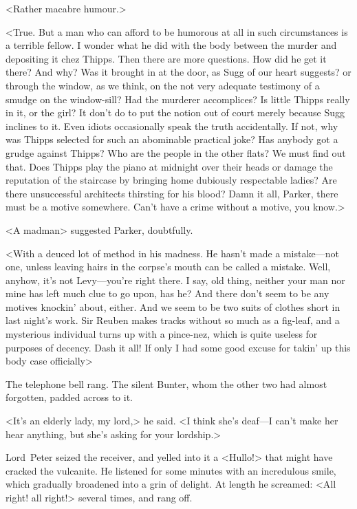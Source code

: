 <Rather macabre humour.>

<True. But a man who can afford to be humorous at all in such circumstances is a terrible fellow. I wonder what he did with the body between the murder and depositing it chez Thipps. Then there are more questions. How did he get it there? And why? Was it brought in at the door, as Sugg of our heart suggests? or through the window, as we think, on the not very adequate testimony of a smudge on the window-sill? Had the murderer accomplices? Is little Thipps really in it, or the girl? It don't do to put the notion out of court merely because Sugg inclines to it. Even idiots occasionally speak the truth accidentally. If not, why was Thipps selected for such an abominable practical joke? Has anybody got a grudge against Thipps? Who are the people in the other flats? We must find out that. Does Thipps play the piano at midnight over their heads or damage the reputation of the staircase by bringing home dubiously respectable ladies? Are there unsuccessful architects thirsting for his blood? Damn it all, Parker, there must be a motive somewhere. Can't have a crime without a motive, you know.>

<A madman\longdash> suggested Parker, doubtfully.

<With a deuced lot of method in his madness. He hasn't made a mistake—not one, unless leaving hairs in the corpse's mouth can be called a mistake. Well, anyhow, it's not Levy—you're right there. I say, old thing, neither your man nor mine has left much clue to go upon, has he? And there don't seem to be any motives knockin' about, either. And we seem to be two suits of clothes short in last night's work. Sir Reuben makes tracks without so much as a fig-leaf, and a mysterious individual turns up with a pince-nez, which is quite useless for purposes of decency. Dash it all! If only I had some good excuse for takin' up this body case officially\longdash>

The telephone bell rang. The silent Bunter, whom the other two had almost forgotten, padded across to it.

<It's an elderly lady, my lord,> he said. <I think she's deaf—I can't make her hear anything, but she's asking for your lordship.>

Lord~Peter seized the receiver, and yelled into it a <Hullo!> that might have cracked the vulcanite. He listened for some minutes with an incredulous smile, which gradually broadened into a grin of delight. At length he screamed: <All right! all right!> several times, and rang off.


